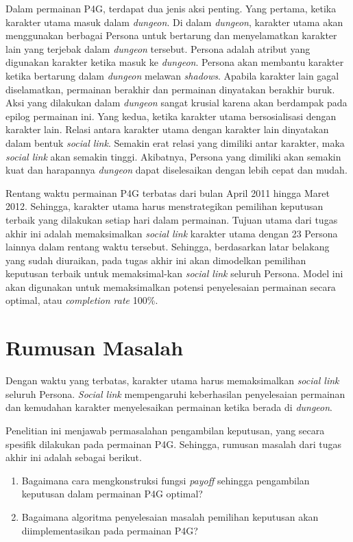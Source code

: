Dalam permainan P4G, terdapat dua jenis aksi penting. Yang pertama, ketika karakter utama masuk dalam \textit{dungeon}. Di dalam \textit{dungeon}, karakter utama akan menggunakan berbagai Persona untuk bertarung dan menyelamatkan karakter lain yang terjebak dalam \textit{dungeon} tersebut. Persona adalah atribut yang digunakan karakter ketika masuk ke \textit{dungeon}. Persona akan membantu karakter ketika bertarung dalam \textit{dungeon} melawan \textit{shadows}. Apabila karakter lain gagal diselamatkan, permainan berakhir dan permainan dinyatakan berakhir buruk. Aksi yang dilakukan dalam \textit{dungeon} sangat krusial karena akan berdampak pada epilog permainan ini. Yang kedua, ketika karakter utama bersosialisasi dengan karakter lain. Relasi antara karakter utama dengan karakter lain dinyatakan dalam bentuk \textit{social link}. Semakin erat relasi yang dimiliki antar karakter, maka \textit{social link} akan semakin tinggi. Akibatnya, Persona yang dimiliki akan semakin kuat dan harapannya \textit{dungeon} dapat diselesaikan dengan lebih cepat dan mudah.

Rentang waktu permainan P4G terbatas dari bulan April 2011 hingga Maret 2012. Sehingga, karakter utama harus menstrategikan pemilihan keputusan terbaik yang dilakukan setiap hari dalam permainan. Tujuan utama dari tugas akhir ini adalah memaksimalkan \textit{social link} karakter utama dengan 23 Persona lainnya dalam rentang waktu tersebut. Sehingga, berdasarkan latar belakang yang sudah diuraikan, pada tugas akhir ini akan dimodelkan pemilihan keputusan terbaik untuk memaksimal-kan \textit{social link} seluruh Persona. Model ini akan digunakan untuk memaksimalkan potensi penyelesaian permainan secara optimal, atau \textit{completion rate} 100\%.

\section{Rumusan Masalah}
Dengan waktu yang terbatas, karakter utama harus memaksimalkan \textit{social link} seluruh Persona. \textit{Social link} mempengaruhi keberhasilan penyelesaian permainan dan kemudahan karakter menyelesaikan permainan ketika berada di \textit{dungeon}.

Penelitian ini menjawab permasalahan pengambilan keputusan, yang secara spesifik dilakukan pada permainan P4G. Sehingga, rumusan masalah dari tugas akhir ini adalah sebagai berikut.
\begin{enumerate}
    \item Bagaimana cara mengkonstruksi fungsi \textit{payoff} sehingga pengambilan keputusan dalam permainan P4G optimal?
    \item Bagaimana algoritma penyelesaian masalah pemilihan keputusan akan diimplementasikan pada permainan P4G?
\end{enumerate}

